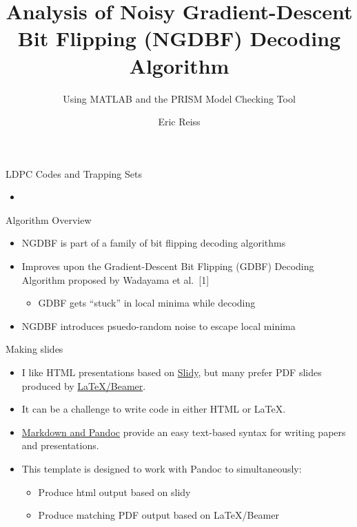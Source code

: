 \documentclass[10pt,ignorenonframetext,]{beamer}
\title{Analysis of Noisy Gradient-Descent Bit Flipping (NGDBF) Decoding
Algorithm}
\subtitle{Using MATLAB and the PRISM Model Checking Tool}
\author{Eric Reiss}
\date{}
\providecommand{\tightlist}{%
  \setlength{\itemsep}{0pt}\setlength{\parskip}{0pt}}
\begin{document}
\frame{\titlepage}

\begin{frame}{LDPC Codes and Trapping Sets}
\protect\hypertarget{ldpc-codes-and-trapping-sets}{}
\begin{itemize}[<+->]
\tightlist
\item
\end{itemize}
\end{frame}

\begin{frame}{Algorithm Overview}
\protect\hypertarget{algorithm-overview}{}
\begin{itemize}[<+->]
\tightlist
\item
  NGDBF is part of a family of bit flipping decoding algorithms
\item
  Improves upon the Gradient-Descent Bit Flipping (GDBF) Decoding
  Algorithm proposed by Wadayama et al.~{[}1{]}

  \begin{itemize}[<+->]
  \tightlist
  \item
    GDBF gets ``stuck'' in local minima while decoding
  \end{itemize}
\item
  NGDBF introduces psuedo-random noise to escape local minima
\end{itemize}
\end{frame}

\begin{frame}{}
\protect\hypertarget{section}{}
\end{frame}

\begin{frame}{Making slides}
\protect\hypertarget{making-slides}{}
\begin{itemize}[<+->]
\item
  I like HTML presentations based on
  \href{https://www.w3.org/Talks/Tools/Slidy2/Overview.html}{Slidy}, but
  many prefer PDF slides produced by
  \href{https://www.ctan.org/pkg/beamer}{\LaTeX/Beamer}.
\item
  It can be a challenge to write code in either HTML or \LaTeX.
\item
  \href{}{Markdown and Pandoc} provide an easy text-based syntax for
  writing papers and presentations.\\
\item
  This template is designed to work with Pandoc to simultaneously:

  \begin{itemize}[<+->]
  \tightlist
  \item
    Produce html output based on slidy
  \item
    Produce matching PDF output based on \LaTeX/Beamer
  \end{itemize}
\end{itemize}
\end{frame}
\end{document}
